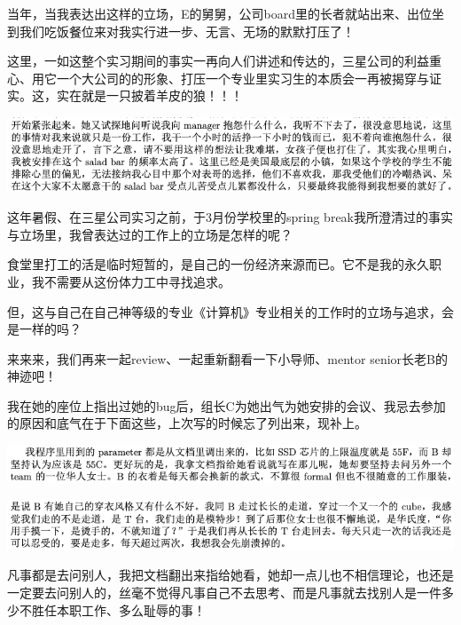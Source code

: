 \documentclass[9pt, b5paper]{article}
\begin{document}
当年，当我表达出这样的立场，E的舅舅，公司board里的长者就站出来、出位坐到我们吃饭餐位来对我实行进一步、无言、无场的默默打压了！

这里，一如这整个实习期间的事实一再向人们讲述和传达的，三星公司的利益重心、用它一个大公司的的形象、打压一个专业里实习生的本质会一再被揭穿与证实。这，实在就是一只披着羊皮的狼！！！

\begin{center}
\includegraphics[width=.9\linewidth]{./pic/backups_plans_20210508_093537.png}
\end{center}

这年暑假、在三星公司实习之前，于3月份学校里的spring break我所澄清过的事实与立场里，我曾表达过的工作上的立场是怎样的呢？

食堂里打工的活是临时短暂的，是自己的一份经济来源而已。它不是我的永久职业，我不需要从这份体力工中寻找追求。

但，这与自己在自己神等级的专业《计算机》专业相关的工作时的立场与追求，会是一样的吗？

来来来，我们再来一起review、一起重新翻看一下小导师、mentor senior长老B的神迹吧！

我在她的座位上指出过她的bug后，组长C为她出气为她安排的会议、我忌去参加的原因和底气在于下面这些，上次写的时候忘了列出来，现补上。 

\begin{center}
\includegraphics[width=.9\linewidth]{./pic/backups_plans_20210507_220006.png}
\end{center}

\begin{center}
\includegraphics[width=.9\linewidth]{./pic/backups_plans_20210507_220034.png}
\end{center}

凡事都是去问别人，我把文档翻出来指给她看，她却一点儿也不相信理论，也还是一定要去问别人的，丝毫不觉得凡事自己不去思考、而是凡事就去找别人是一件多少不胜任本职工作、多么耻辱的事！
\end{document}
